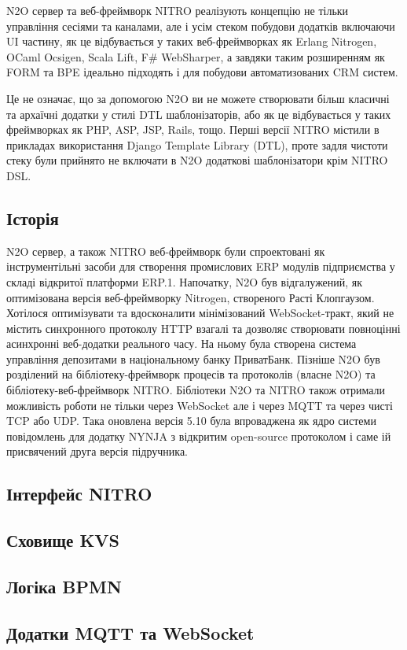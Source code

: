N2O сервер та веб-фреймворк NITRO реалізують концепцію не тільки
управління сесіями та каналами, але і усім стеком побудови додатків
включаючи UI частину, як це відбувається у таких веб-фреймворках як
Erlang Nitrogen, OCaml Ocsigen, Scala Lift, F\# WebSharper, а завдяки
таким розширенням як FORM та BPE ідеально підходять і для побудови
автоматизованих CRM систем.

Це не означає, що за допомогою N2O ви не можете створювати більш
класичні та архаїчні додатки у стилі DTL шаблонізаторів, або як це
відбувається у таких фреймворках як PHP, ASP, JSP, Rails, тощо.
Перші версії NITRO містили в прикладах використання Django Template
Library (DTL), проте задля чистоти стеку були прийнято не включати
в N2O додаткові шаблонізатори крім NITRO DSL.

\subsection{Історія}

N2O сервер, а також NITRO веб-фреймворк були спроектовані як інструментільні засоби
для створення промислових ERP модулів підприємства у складі відкритої платформи ERP.1.
Напочатку, N2O був відгалужений, як оптимізована версія веб-фреймворку Nitrogen,
створеного Расті Клопгаузом. Хотілося оптимізувати та вдосконалити мінімізований
WebSocket-тракт, який не містить синхронного протоколу HTTP взагалі та дозволяє
створювати повноцінні асинхронні веб-додатки реального часу. На ньому була створена
система управління депозитами в національному банку ПриватБанк. Пізніше N2O був розділений
на бібліотеку-фреймворк процесів та протоколів (власне N2O) та бібліотеку-веб-фреймворк NITRO.
Бібліотеки N2O та NITRO також отримали можливість роботи не тільки через WebSocket але і
через MQTT та через чисті TCP або UDP. Така оновлена версія 5.10 була впроваджена як ядро
системи повідомлень для додатку NYNJA з відкритим open-source протоколом і саме ій
присвячений друга версія підручника.

\subsection{Інтерфейс NITRO}

\subsection{Сховище KVS}

\subsection{Логіка BPMN}

\subsection{Додатки MQTT та WebSocket}
